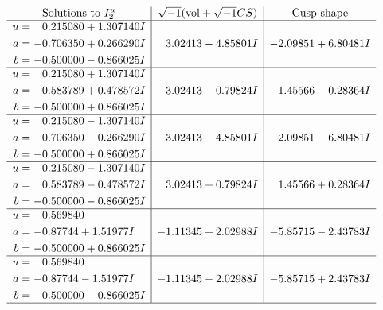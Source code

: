 \documentclass[1p]{elsarticle_modified}
\theoremstyle{definition}
\newcommand{\I}{\sqrt{-1}}
\begin{document}
$$\begin{array}{c|c|c}  
\text{Solutions to }I^u_{2}& \I (\text{vol} + \sqrt{-1}CS) & \text{Cusp shape}\\
 \hline 
\begin{aligned}
u &= \phantom{-}0.215080 + 1.307140 I \\
a &= -0.706350 + 0.266290 I \\
b &= -0.500000 - 0.866025 I\end{aligned}
 & \phantom{-}3.02413 - 4.85801 I & -2.09851 + 6.80481 I \\ \hline\begin{aligned}
u &= \phantom{-}0.215080 + 1.307140 I \\
a &= \phantom{-}0.583789 + 0.478572 I \\
b &= -0.500000 + 0.866025 I\end{aligned}
 & \phantom{-}3.02413 - 0.79824 I & \phantom{-}1.45566 - 0.28364 I \\ \hline\begin{aligned}
u &= \phantom{-}0.215080 - 1.307140 I \\
a &= -0.706350 - 0.266290 I \\
b &= -0.500000 + 0.866025 I\end{aligned}
 & \phantom{-}3.02413 + 4.85801 I & -2.09851 - 6.80481 I \\ \hline\begin{aligned}
u &= \phantom{-}0.215080 - 1.307140 I \\
a &= \phantom{-}0.583789 - 0.478572 I \\
b &= -0.500000 - 0.866025 I\end{aligned}
 & \phantom{-}3.02413 + 0.79824 I & \phantom{-}1.45566 + 0.28364 I \\ \hline\begin{aligned}
u &= \phantom{-}0.569840\phantom{ +0.000000I} \\
a &= -0.87744 + 1.51977 I \\
b &= -0.500000 + 0.866025 I\end{aligned}
 & -1.11345 + 2.02988 I & -5.85715 - 2.43783 I \\ \hline\begin{aligned}
u &= \phantom{-}0.569840\phantom{ +0.000000I} \\
a &= -0.87744 - 1.51977 I \\
b &= -0.500000 - 0.866025 I\end{aligned}
 & -1.11345 - 2.02988 I & -5.85715 + 2.43783 I\\
 \hline 
 \end{array}$$\newpage
\end{document}
